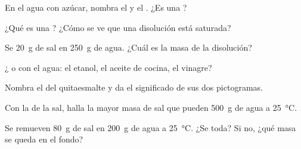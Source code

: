 \begin{exercise}[$\star$]\label{exo:g6:solutions-and-solubility:1}
En el agua con azúcar, nombra el  y el . ¿Es una
?
\end{exercise}

\begin{exercise}[$\star$]\label{exo:g6:solutions-and-solubility:2}
¿Qué es una ? ¿Cómo se ve que una disolución está
saturada?
\end{exercise}

\begin{exercise}[$\star$]\label{exo:g6:solutions-and-solubility:3}
Se  \qty{20}{g} de sal en \qty{250}{g} de agua. ¿Cuál es la
masa de la disolución?
\end{exercise}

\begin{exercise}[$\star$]\label{exo:g6:solutions-and-solubility:4}
¿ o  con el agua: el etanol, el aceite de cocina, el
vinagre?
\end{exercise}

\begin{exercise}[$\star$]\label{exo:g6:solutions-and-solubility:5}
Nombra el  del quitaesmalte y da el significado de sus dos
pictogramas.
\end{exercise}

\begin{exercise}[$\star\star$]\label{exo:g6:solutions-and-solubility:6}
Con la  de la sal, halla la mayor masa de sal que pueden
 \qty{500}{g} de agua a \qty{25}{\celsius}.
\end{exercise}

\begin{exercise}[$\star\star$]\label{exo:g6:solutions-and-solubility:7}
Se remueven \qty{80}{g} de sal en \qty{200}{g} de agua a
\qty{25}{\celsius}. ¿Se  toda? Si no, ¿qué masa se queda en el
fondo?
\end{exercise}

